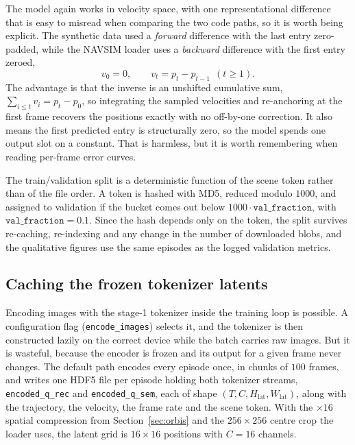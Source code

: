 The model again works in velocity space, with one representational difference
that is easy to misread when comparing the two code paths, so it is worth being
explicit. The synthetic data used a \emph{forward} difference with the last entry
zero-padded, while the NAVSIM loader uses a \emph{backward} difference with the
first entry zeroed,
\begin{equation}
v_0 = 0,\qquad v_t = p_t - p_{t-1}\ \ (t\ge 1).
\label{eq:navsim-velocity}
\end{equation}
The advantage is that the inverse is an unshifted cumulative sum,
$\sum_{i\le t} v_i = p_t - p_0$, so integrating the sampled velocities and
re-anchoring at the first frame recovers the positions exactly with no
off-by-one correction. It also means the first predicted entry is structurally
zero, so the model spends one output slot on a constant. That is harmless, but it
is worth remembering when reading per-frame error curves.

The train/validation split is a deterministic function of the scene token rather
than of the file order. A token is hashed with MD5, reduced modulo $1000$, and
assigned to validation if the bucket comes out below
$1000\cdot\texttt{val\_fraction}$, with $\texttt{val\_fraction}=0.1$. Since the
hash depends only on the token, the split survives re-caching, re-indexing and
any change in the number of downloaded blobs, and the qualitative figures use the
same episodes as the logged validation metrics.

\subsection{Caching the frozen tokenizer latents}
\label{sec:navsim-cache}

Encoding images with the stage-1 tokenizer inside the training loop is possible.
A configuration flag (\texttt{encode\_images}) selects it, and the tokenizer is
then constructed lazily on the correct device while the batch carries raw images.
But it is wasteful, because the encoder is frozen and its output for a given
frame never changes. The default path encodes every episode once, in chunks of
$100$ frames, and writes one HDF5 file per episode holding both tokenizer
streams, \texttt{encoded\_q\_rec} and \texttt{encoded\_q\_sem}, each of shape
$(T, C, H_{\text{lat}}, W_{\text{lat}})$, along with the trajectory, the
velocity, the frame rate and the scene token. With the $\times16$ spatial
compression from Section~\ref{sec:orbis} and the $256\times256$ centre crop the
loader uses, the latent grid is $16\times16$ positions with $C=16$ channels.

